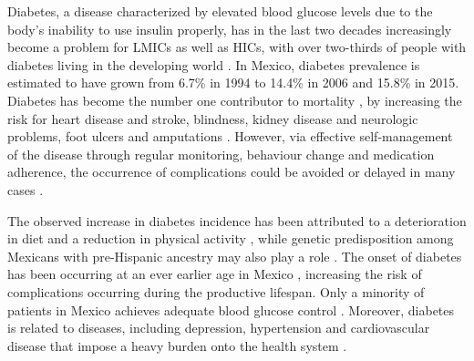 \documentclass[12pt,english]{article}
\begin{document}
Diabetes, a disease characterized by elevated blood glucose levels due to the body's inability to use insulin properly, has in the last two decades increasingly become a problem for \acp{LMIC} as well as \acp{HIC}, with over two-thirds of people with diabetes living in the developing world \parencite{InternationalDiabetesFederation2015}. In Mexico, diabetes prevalence is estimated to have grown from 6.7\% in 1994 to 14.4\% in 2006 \parencite{Barquera2013} and 15.8\% in 2015. Diabetes has become the number one contributor to mortality \parencite{InternationalDiabetesFederation2015}, by increasing the risk for heart disease and stroke, blindness, kidney disease and neurologic problems, foot ulcers and amputations \parencite{Reynoso-Noveron2011}. However, via effective self-management of the disease through regular monitoring, behaviour change and medication adherence, the occurrence of complications could be avoided or delayed in many cases \parencite{Lim2011, Gregg2012}.

The observed increase in diabetes incidence has been attributed to a deterioration in diet and a reduction in physical activity \parencite{Barquera2008b,Basu2013}, while genetic predisposition among Mexicans with pre-Hispanic ancestry may also play a role \parencite{Williams2013}. The onset of diabetes has been occurring at an ever earlier age in Mexico \parencite{Bello-Chavolla2017a}, increasing the risk of complications occurring during the productive lifespan. Only a minority of patients in Mexico achieves adequate blood glucose control \parencite{Barquera2013}. Moreover, diabetes is related to diseases, including depression, hypertension and cardiovascular disease that impose a heavy burden onto the health system \parencite{WorldHealthOrganization2016}.
\end{document}
